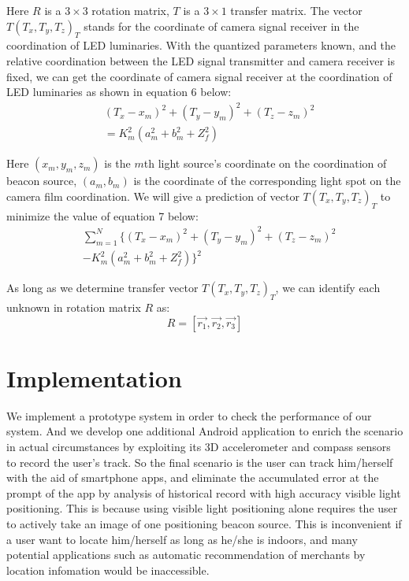 \documentclass[conference]{IEEEtran}
\begin{document}
Here $R$ is a $3 \times 3$ rotation matrix, $T$ is a $3 \times 1$ transfer matrix. The vector $T(T_x,T_y,T_z)_T$ stands for the coordinate of camera signal receiver in the coordination of LED luminaries. With the quantized parameters known, and the relative coordination between the LED signal transmitter and camera receiver is fixed, we can get the coordinate of camera signal receiver at the coordination of LED luminaries as shown in equation 6 below:
\begin{equation}
\begin{split}
& (T_x-x_m)^2 + (T_y-y_m)^2 + (T_z-z_m)^2 \\
& =K_m^2(a_m^2+b_m^2+Z_f^2)
\end{split}
\end{equation}
 
Here $(x_m,y_m,z_m)$ is the $m$th light source's coordinate on the coordination of beacon source, $(a_m, b_m)$ is the coordinate of the corresponding light spot on the camera film coordination. We will give a prediction of vector $T(T_x,T_y,T_z)_T$ to minimize the value of equation 7 below:
\begin{equation}
\begin{split}
	& \sum_{m=1}^N\{(T_x-x_m)^2 + (T_y-y_m)^2 + (T_z-z_m)^2 \\
	& - K_m^2(a_m^2+b_m^2+Z_f^2)\}^2
\end{split}
\end{equation}

As long as we determine transfer vector $T(T_x,T_y,T_z)_T$, we can identify each unknown in rotation matrix $R$ as:
\begin{equation}
	R = [\vec{r_1}, \vec{r_2}, \vec{r_3}]
\end{equation}

\section{\textbf{Implementation}}
We implement a prototype system in order to check the performance of our system. And we develop one additional Android application to enrich the scenario in actual circumstances by exploiting its 3D accelerometer and compass sensors to record the user's track. So the final scenario is the user can track him/herself with the aid of smartphone apps, and eliminate the accumulated error at the prompt of the app by analysis of historical record with high accuracy visible light positioning. This is because using visible light positioning alone requires the user to actively take an image of one positioning beacon source. This is inconvenient if a user want to locate him/herself as long as he/she is indoors, and many potential applications such as automatic recommendation of merchants by location infomation would be inaccessible. 
\end{document}
